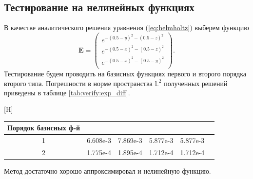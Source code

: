 \documentclass[a4paper,14pt]{article}
\makeatletter
\renewenvironment{table}[1][\fps@table]{
  \edef\@tempa{\noexpand\@float{table}[#1]}
  \@tempa
  \addtocounter{footable}{1}
}{
  \end@float
}
\makeatother
\begin{document}

\subsection{Тестирование на нелинейных функциях}

В качестве аналитического решения уравнения (\ref{eq:helmholtz}) выберем функцию
\begin{equation}
	\mathbf{E} = \left( \begin{array}{c}
		e^{-(0.5-y)^2 -(0.5-z)^2} \\
		e^{-(0.5-x)^2 -(0.5-z)^2} \\
		e^{-(0.5-x)^2 -(0.5-y)^2} \\
	\end{array} \right) .
	\label{eq:verify:exp_solution}
\end{equation}
Тестирование будем проводить на базисных функциях первого и второго порядка второго типа. Погрешности в норме пространства $\mathbb{L}^2$ полученных решений приведены в таблице \ref{tab:verify:exp_diff}.

\begin{table}[H]
	\caption{относительные погрешности в норме $\mathbb{L}^2$}
	\label{tab:verify:exp_diff}
	\begin{tabularx}{\textwidth}{|C{1}|C{1}|C{1}|C{1}|C{1}|C{1}|}
		\hline Порядок базисных ф-й &  &  &  &  \\
		 & 6.608e-3 & 7.869e-3 & 5.877e-3 & 5.877e-3 \\
		 & 1.775e-4 & 1.895e-4 & 1.712e-4 & 1.712e-4 \\
		\hline
	\end{tabularx}
\end{table}
\vspace{-0.5cm}Метод достаточно хорошо аппроксимировал и нелинейную функцию.

\end{document}
